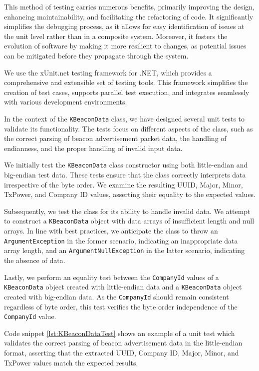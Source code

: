 This method of testing carries numerous benefits, primarily improving the design, enhancing maintainability, and facilitating the refactoring of code. It significantly simplifies the debugging process, as it allows for easy identification of issues at the unit level rather than in a composite system. Moreover, it fosters the evolution of software by making it more resilient to changes, as potential issues can be mitigated before they propagate through the system.\cite{sommervilleSoftwareEngineering2016}

We use the xUnit.net testing framework for .NET, which provides a comprehensive and extensible set of testing tools. This framework simplifies the creation of test cases, supports parallel test execution, and integrates seamlessly with various development environments.\cite{xunitdotnet}

In the context of the \texttt{KBeaconData} class, we have designed several unit tests to validate its functionality. The tests focus on different aspects of the class, such as the correct parsing of beacon advertisement packet data, the handling of endianness, and the proper handling of invalid input data. 

We initially test the \texttt{KBeaconData} class constructor using both little-endian and big-endian test data. These tests ensure that the class correctly interprets data irrespective of the byte order. We examine the resulting UUID, Major, Minor, TxPower, and Company ID values, asserting their equality to the expected values.

Subsequently, we test the class for its ability to handle invalid data. We attempt to construct a \texttt{KBeaconData} object with data arrays of insufficient length and null arrays. In line with best practices, we anticipate the class to throw an \texttt{ArgumentException} in the former scenario, indicating an inappropriate data array length, and an \texttt{ArgumentNullException} in the latter scenario, indicating the absence of data.

Lastly, we perform an equality test between the \texttt{CompanyId} values of a \\\texttt{KBeaconData} object created with little-endian data and a \texttt{KBeaconData} object created with big-endian data. As the \texttt{CompanyId} should remain consistent regardless of byte order, this test verifies the byte order independence of the \texttt{CompanyId} value.

Code snippet \ref{lst:KBeaconDataTest} shows an example of a unit test which validates the correct parsing of beacon advertisement data in the little-endian format, asserting that the extracted UUID, Company ID, Major, Minor, and TxPower values match the expected results.

